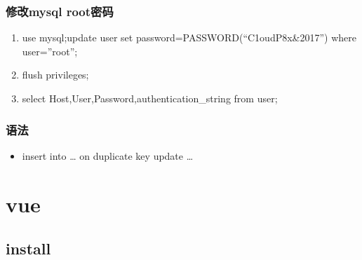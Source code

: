 \documentclass[a4paper,10pt,english]{sphinxmanual}
\begin{document}
\subsubsection{修改mysql root密码}
\label{\detokenize{program/mysql:mysql-root}}\begin{enumerate}
\item {} 
use mysql;update user set password=PASSWORD(“C1oudP8x\&2017”) where user=”root”;

\item {} 
flush privileges;

\item {} 
select Host,User,Password,authentication\_string from user;

\end{enumerate}


\subsubsection{语法}
\label{\detokenize{program/mysql:id3}}\begin{itemize}
\item {} 
insert into … on duplicate key update …

\begin{sphinxVerbatim}[commandchars=\\\{\}]
                
\end{sphinxVerbatim}

\end{itemize}


\section{vue}
\label{\detokenize{program/vue:vue}}\label{\detokenize{program/vue::doc}}

\subsection{install}
\label{\detokenize{program/vue:install}}
\end{document}
